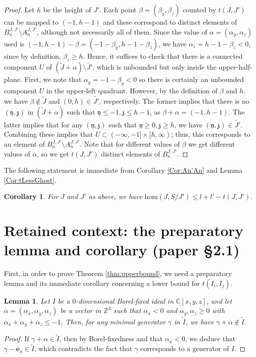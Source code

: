 \documentclass[10pt,a4paper]{amsart}
\newcommand{\BC}{{\mathbb{C}}}
\newcommand{\BZ}{{\mathbb{Z}}}
\newcommand{\Fy}{{\mathfrak{y}}}
\newcommand{\Fz}{{\mathfrak{z}}}
\newtheorem{lemma}{Lemma}
\newtheorem{corollary}{Corollary}
\begin{document}
\begin{proof}

   Let $h$ be the height of $J'$. Each point $\beta=(\beta_y,\beta_z)$ counted by $t(J,J')$ can be mapped to $(-1,h-1)$ and these correspond to distinct elements of $B^{J,J'}_n\setminus A^{J,J'}_n$, although not necessarily all of them. Since the value of $\alpha=(\alpha_y,\alpha_z)$ used is $(-1,h-1)-\beta=(-1-\beta_y,h-1-\beta_z)$, we have $\alpha_z=h-1-\beta_z<0$, since by definition, $\beta_z\geq h$. Hence, it suffices to check that there is a connected component $U$ of $(\tilde{J}+\alpha)\setminus\tilde{J'}$, which is unbounded but only inside the upper-half-plane. First, we note that $\alpha_y=-1-\beta_y<0$ so there is certainly an unbounded component $U$ in the upper-left quadrant. However, by the definition of $\beta$ and $h$, we have $\beta\notin\tilde{J}$ and $(0,h)\in\tilde{J'}$, respectively. The former implies that there is no $(\Fy,\Fz)$ in $(\tilde{J}+\alpha)$ such that $\Fy\leq-1,\Fz\leq h-1$, as $\beta+\alpha=(-1,h-1)$. The latter implies that for any $(\Fy,\Fz)$ such that $\Fy\geq 0,\Fz\geq h$, we have $(\Fy,\Fz)\in\tilde{J'}$. Combining these implies that $U\subset (-\infty,-1]\times[h,\infty)$; thus, this corresponds to an element of $B^{J,J'}_n\setminus A^{J,J'}_n$. Note that for different values of $\beta$ we get different values of $\alpha$, so we get $t(J,J')$ distinct elements of $B^{J,J'}_n$.
\end{proof}

The following statement is immediate from Corollary \ref{Cor:An'An} and Lemma \ref{Cor:tLessGhost}. 

\begin{corollary}\label{cor:ineq}
    For $J$ and $J'$ as above, we have $\mathrm{hom}(J,S/J')\leq l+l'-t(J,J')$.
\end{corollary}

\section*{Retained context: the preparatory lemma and corollary (paper \S2.1)}
First, in order to prove Theorem \ref{thm:upperbound}, we need a preparatory lemma and its immediate corollary concerning a lower bound for $t(I_i,I_j)$.
\begin{lemma}\label{Lem:bound}
    Let $I$ be a $0$-dimensional Borel-fixed ideal in $\BC[x,y,z]$, and let $\alpha=(\alpha_x,\alpha_y,\alpha_z)$ be a vector in $\BZ^3$ such that $\alpha_x<0$ and $\alpha_y,\alpha_z\geq0$ with $\alpha_x+\alpha_y+\alpha_z\leq-1$. Then, for any minimal generator $\gamma$ in $\tilde{I}$, we have $\gamma+\alpha\notin\tilde{I}$.
\end{lemma}
\begin{proof}
    If $\gamma+\alpha\in\tilde{I}$, then by Borel-fixedness and that $\alpha_x<0$, we deduce that $\gamma-\mathbf{e}_x\in\tilde{I}$, which contradicts the fact that $\gamma$ corresponds to a generator of $I$. 
\end{proof}
\end{document}

